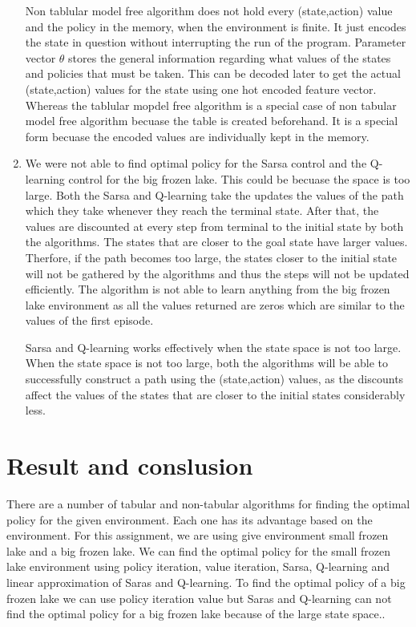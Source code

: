 \documentclass[11pt]{article}
\begin{document}
\begin{enumerate}
		Non tablular model free algorithm does not hold every (state,action) value and the policy in the memory, when the environment is finite. It just encodes the state in question without interrupting the run of the program. Parameter vector $\theta$ stores the general information regarding what values of the states and policies that must be taken. This can be decoded later to get the actual (state,action) values for the state using one hot encoded feature vector. Whereas the tablular mopdel free algorithm is a special case of non tabular model free algorithm becuase the table is created beforehand. It is a special form becuase the encoded values are individually kept in the memory.
		
		\item We were not able to find optimal policy for the Sarsa control and the Q-learning control for the big frozen lake. This could be becuase the space is too large. Both the Sarsa and Q-learning take the updates the values of the path which they take whenever they reach the terminal state. After that, the values are discounted at every step from terminal to the initial state by both the algorithms. The states that are closer to the goal state have larger values. Therfore, if the path becomes too large, the states closer to the initial state will not be gathered by the algorithms and thus the steps will not be updated efficiently. The algorithm is not able to learn anything from the big frozen lake environment as all the values returned are zeros which are similar to the values of the first episode. \par
		
		Sarsa and Q-learning works effectively when the state space is not too large. When the state space is not too large, both the algorithms will be able to successfully construct a path using the (state,action) values, as the discounts affect the values of the states that are closer to the initial states considerably less.
	\end{enumerate}
\section{Result and conslusion}
There are a number of tabular and non-tabular algorithms for finding the optimal policy for the given environment. Each one has its advantage based on the environment.  For this assignment, we are using give environment small frozen lake and a big frozen lake. We can find the optimal policy for the small frozen lake environment using policy iteration, value iteration, Sarsa, Q-learning and linear approximation of Saras and Q-learning. To find the optimal policy of a big frozen lake we can use policy iteration value but Saras and Q-learning can not find the optimal policy for a big frozen lake because of the large state space.. 
\end{document}

